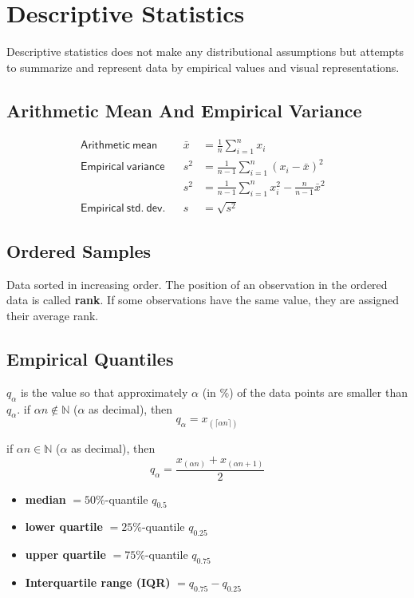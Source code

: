 \section{Descriptive Statistics}
Descriptive statistics does not make any distributional assumptions but attempts to summarize and represent data by empirical values and visual representations.
\subsection{Arithmetic Mean And Empirical Variance}
\noindent\begin{align*}
    \mathsf{Arithmetic\ mean}      &  & \bar{x}      & =\frac{1}{n}\sum_{i=1}^{n}x_i                 \\
    \mathsf{Empirical\ variance}   &  & s^2          & =\frac{1}{n-1}\sum_{i=1}^{n}{(x_i-\bar{x})}^2 & \\
                                   &  & s^2          & =\frac{1}{n-1}\sum_{i=1}^{n}x_i^2 - \frac{n}{n-1} \bar{x}^2 & \\
    \mathsf{Empirical\ std.\ dev.} &  & s&=\sqrt{s^2}
\end{align*}

\subsection{Ordered Samples}

Data sorted in increasing order. The position of an observation in the ordered data is called \textbf{rank}. If some observations have the same value, they are assigned their average rank.

\subsection{Empirical Quantiles}
$q_\alpha$ is the value so that approximately $\alpha$ (in $\%$) of the data points are smaller than $q_\alpha$.
\newpar{}
if $\alpha n \notin \mathbb{N}$ ($\alpha$ as decimal), then
\begin{equation*}
    q_\alpha = x_{(\lceil\alpha n\rceil)}
\end{equation*}

if $\alpha n \in \mathbb{N}$ ($\alpha$ as decimal), then
\begin{equation*}
    q_\alpha = \frac{x_{(\alpha n)}+x_{(\alpha n+1)}}{2}
\end{equation*}

\newpar{}
\begin{itemize}
    \item \textbf{median} $= 50\%$-quantile $q_{0.5}$
    \item \textbf{lower quartile} $= 25\%$-quantile $q_{0.25}$
    \item \textbf{upper quartile} $= 75\%$-quantile $q_{0.75}$
    \item \textbf{Interquartile range (IQR)} $= q_{0.75} - q_{0.25}$
\end{itemize}

